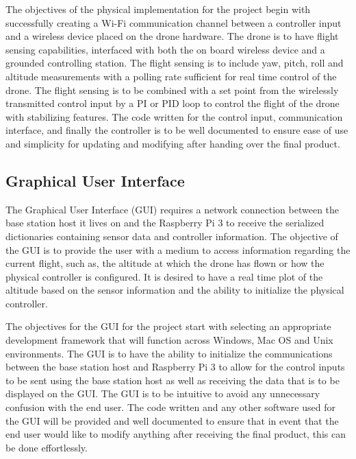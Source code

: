 The objectives of the physical implementation for the project begin with successfully creating a Wi-Fi communication channel between a controller input and a wireless device placed on the drone hardware. The drone is to have flight sensing capabilities, interfaced with both the on board wireless device and a grounded controlling station. The flight sensing is to include yaw, pitch, roll and altitude measurements with a polling rate sufficient for real time control of the drone. The flight sensing is to be combined with a set point from the wirelessly transmitted control input by a PI or PID loop to control the flight of the drone with stabilizing features. The code written for the control input, communication interface, and finally the controller is to be well documented to ensure ease of use and simplicity for updating and modifying after handing over the final product.


\subsection{Graphical User Interface}


The Graphical User Interface (GUI) requires a network connection between the base station host it lives on and the Raspberry Pi 3 to receive the serialized dictionaries containing sensor data and controller information. The objective of the GUI is to provide the user with a medium to access information regarding the current flight, such as, the altitude at which the drone has flown or how the physical controller is configured. It is desired to have a real time plot of the altitude based on the sensor information and the ability to initialize the physical controller. 

The objectives for the GUI for the project start with selecting an appropriate development framework that will function across Windows, Mac OS and Unix environments.  The GUI is to have the ability to initialize the communications between the base station host and Raspberry Pi 3 to allow for the control inputs to be sent using the base station host as well as receiving the data that is to be displayed on the GUI. The GUI is to be intuitive to avoid any unnecessary confusion with the end user. The code written and any other software used for the GUI will be provided and well documented to ensure that in event that the end user would like to modify anything after receiving the final product, this can be done effortlessly. 
  
